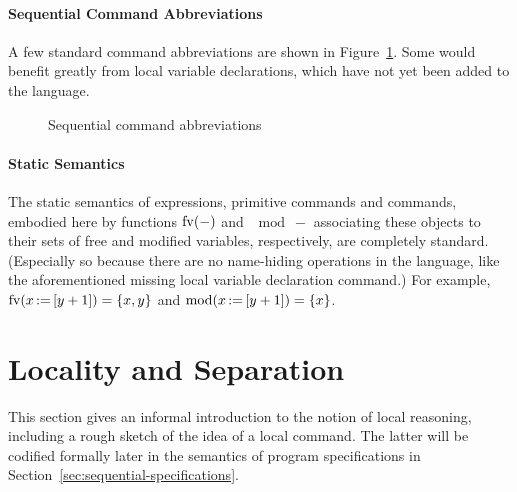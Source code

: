 \documentclass[11pt]{report}         %
\begin{document}
\paragraph{Sequential Command Abbreviations} A few standard command abbreviations are shown in Figure~\ref{fig:sequential-command-abbreviations}. Some would benefit greatly from local variable declarations, which have not yet been added to the language. 

\begin{figure}[ht]
    \centering
    \caption{\label{fig:sequential-command-abbreviations} Sequential command abbreviations}
\end{figure}

\paragraph{Static Semantics} The static semantics of expressions, primitive commands and commands, embodied here by functions $\mathrm{fv}(-)$ and $\mod{-}$ associating these objects to their sets of free and modified variables, respectively, are completely standard. (Especially so because there are no name-hiding operations in the language, like the aforementioned missing local variable declaration command.) For example, $\mathrm{fv}(x \operatorname{:\!=} \left[ y+1 \right]) = \left\lbrace x,y \right\rbrace$ and $\mathrm{mod}(x \operatorname{:\!=} \left[ y+1 \right]) = \left\lbrace x \right\rbrace$.  

\section{Locality and Separation}
\label{sec:locality}

This section gives an informal introduction to the notion of local reasoning, including a rough sketch of the idea of a local command. The latter will be codified formally later in the semantics of program specifications in Section~\ref{sec:sequential-specifications}. 
\end{document}
